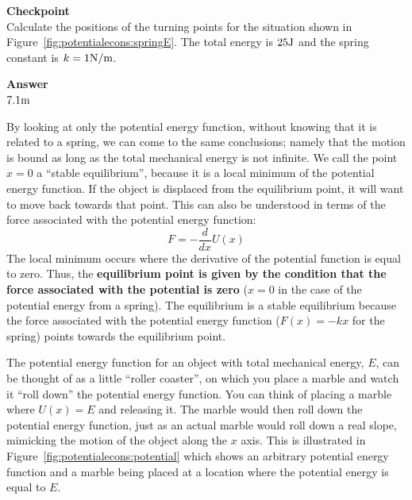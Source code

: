 \begin{framed}
\textbf{Checkpoint}\\
Calculate the positions of the turning points for the situation shown in Figure~\ref{fig:potentialecons:springE}. The total energy is $25 {\rm J}$ and the spring constant is $k=1 {\rm N/m}$.

\begin{framed}
\textbf{Answer}\\
$7.1 {\rm m}$
\end{framed}
\end{framed}

By looking at only the potential energy function, without knowing that it is related to a spring, we can come to the same conclusions; namely that the motion is bound as long as the total mechanical energy is not infinite. We call the point $x=0$ a ``stable equilibrium'', because it is a local minimum of the potential energy function. If the object is displaced from the equilibrium point, it will want to move back towards that point. This can also be understood in terms of the force associated with the potential energy function:
\begin{equation}
F = -\frac{d}{dx}U(x)
\end{equation}
The local minimum occurs where the derivative of the potential function is equal to zero. Thus, the \textbf{equilibrium point is given by the condition that the force associated with the potential is zero} ($x=0$ in the case of the potential energy from a spring). The equilibrium is a stable equilibrium because the force associated with the potential energy function ($F(x)= -kx$ for the spring) points towards the equilibrium point.

The potential energy function for an object with total mechanical energy, $E$, can be thought of as a little ``roller coaster'', on which you place a marble and watch it ``roll down'' the potential energy function. You can think of placing a marble where $U(x)=E$ and releasing it. The marble would then roll down the potential energy function, just as an actual marble would roll down a real slope, mimicking the motion of the object along the $x$ axis. This is illustrated in Figure~\ref{fig:potentialecons:potential} which shows an arbitrary potential energy function and a marble being placed at a location where the potential energy is equal to $E$.

